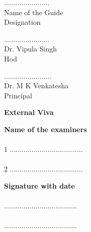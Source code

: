 \vspace{1.5cm}
\begin{minipage}[t]{0.3\textwidth}%
.......................\\
{\color{red}Name of the Guide}\\
Designation\\
\end{minipage}\hspace{0.06cm}
\begin{minipage}[t]{0.3\textwidth}%
.......................\\
{\color{red}Dr. Vipula Singh}\\
Hod\\
\end{minipage}
\begin{minipage}[t]{0.3\textwidth}%
........................\\
{\color{red}Dr. M K Venkatesha}\\
Principal\\
\end{minipage}

\begin{center}
	\textbf{{\color{blue}External Viva}}
\end{center}

\vspace{0.5cm}
\begin{minipage}[t]{0.6\textwidth}%
\textbf{Name of the examiners}\\\\
1 .....................................\\
\\
2 .....................................\\
\end{minipage}\hspace{0.06cm}
\begin{minipage}[t]{0.6\textwidth}%
\textbf{Signature with date}\\\\
.....................................\\
\\
.....................................\\
\end{minipage}
